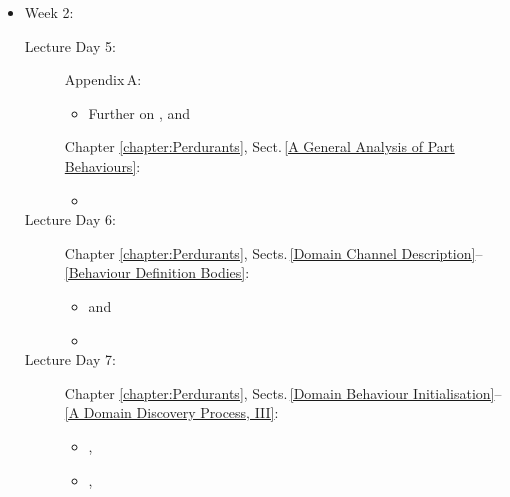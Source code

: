 {\begin{itemize}
\begin{description}
\item[Lecture Day 4:] Sections\,\,\ref{chap4.Attributes}--\ref{A
    Domain Discovery Process, II}:
\begin{itemize}
\item {},
\item {},
\item {}
\end{itemize}
\end{description}
\item Week 2:
\begin{description}
\item[Lecture Day 5:]  Appendix\,A: 
\begin{itemize}
\item {}  Further on , and
\end{itemize}
 Chapter\,\,\ref{chapter:Perdurants}, Sect.\,\ref{A General Analysis of Part  Behaviours}:
\begin{itemize}
\item {}
\end{itemize}
\item[Lecture Day 6:] Chapter\,\,\ref{chapter:Perdurants},
  Sects.\,\ref{Domain Channel Description}--\ref{Behaviour Definition Bodies}: 
\begin{itemize}
\item {} and
\item {}
\end{itemize}
\item[Lecture Day 7:] Chapter\,\,\ref{chapter:Perdurants},
  Sects.\,\ref{Domain Behaviour Initialisation}--\ref{A Domain Discovery Process, III}:
\begin{itemize}
\item {}, 
\item {},
\end{itemize}
\end{description}
\end{itemize}
\afslut
}%



